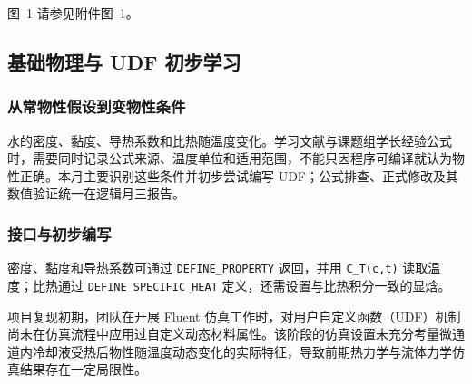\documentclass[stage1,fontset=fandol]{ydzjreport}
\makeatletter
\newcommand{\submissionnumber}[1]{\def\@currentlabel{#1}}
\makeatother
\begin{document}
\par\noindent \begingroup\submissionnumber{1a}\label{fig:repro-t}\endgroup \begingroup\submissionnumber{1b}\label{fig:repro-p}\endgroup \begingroup\submissionnumber{1c}\label{fig:repro-v}\endgroup \begingroup\submissionnumber{1d}\label{fig:repro-cu}\endgroup \begingroup\submissionnumber{1e}\label{fig:h5-t}\endgroup \begingroup\submissionnumber{1f}\label{fig:h5-p}\endgroup \begingroup\submissionnumber{1g}\label{fig:h5-v}\endgroup \begingroup\submissionnumber{1h}\label{fig:h5-cu}\endgroup \begingroup\submissionnumber{1i}\label{fig:circle-t}\endgroup \begingroup\submissionnumber{1j}\label{fig:circle-p}\endgroup \begingroup\submissionnumber{1k}\label{fig:circle-v}\endgroup \begingroup\submissionnumber{1l}\label{fig:circle-cu}\endgroup \begingroup\submissionnumber{1}\label{fig:repro}\endgroup 图~1 请参见附件图~1。\par


\subsection{基础物理与 UDF 初步学习}

\subsubsection{从常物性假设到变物性条件}

水的密度、黏度、导热系数和比热随温度变化。学习文献与课题组学长经验公式时，需要同时记录公式来源、温度单位和适用范围，不能只因程序可编译就认为物性正确。本月主要识别这些条件并初步尝试编写 UDF；公式排查、正式修改及其数值验证统一在逻辑月三报告。

\subsubsection{接口与初步编写}

密度、黏度和导热系数可通过 \texttt{DEFINE\_PROPERTY} 返回，并用 \texttt{C\_T(c,t)} 读取温度；比热通过 \texttt{DEFINE\_SPECIFIC\_HEAT} 定义，还需设置与比热积分一致的显焓。

项目复现初期，团队在开展 Fluent 仿真工作时，对用户自定义函数（UDF）机制尚未在仿真流程中应用过自定义动态材料属性。该阶段的仿真设置未充分考量微通道内冷却液受热后物性随温度动态变化的实际特征，导致前期热力学与流体力学仿真结果存在一定局限性。
\end{document}
